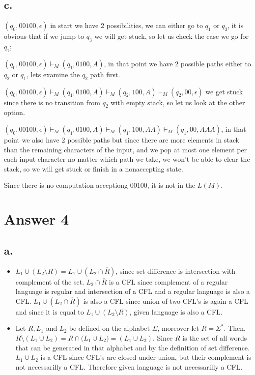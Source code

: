 \documentclass[12pt]{article}
\begin{document}
\subsection*{c.}
$(q_0, 00100, \epsilon )$ in start we have 2 possibilities, we can either go to $q_1$ or $q_3$,
it is obvious that if we jump to $q_3$ we will get stuck, so let us check the case we go for
$q_1$;

$(q_0, 00100, \epsilon )\vdash_M (q_1, 0100, A)$, in that point we have 2 possible paths either to $q_2$
or $q_1$, lets examine the $q_2$ path first.

$(q_0, 00100, \epsilon )\vdash_M (q_1, 0100, A)\vdash_M (q_2, 100, A)\vdash_M (q_2, 00, \epsilon)$
we get stuck since there is no transition from $q_2$ with empty stack, so let us look at the
other option.

$(q_0, 00100, \epsilon )\vdash_M (q_1, 0100, A)\vdash_M (q_1, 100, AA)\vdash_M (q_1, 00, AAA)$, in that
point we also have 2 possible paths but since there are more elements in stack than the remaining
characters of the input, and we pop at most one element per each input character no matter
which path we take, we won't be able to clear the stack, so we will get stuck or finish in a
nonaccepting state.

Since there is no computation acceptiong $00100$, it is not in the $L(M)$.

\section*{Answer 4}

\subsection*{a.}
\begin{itemize}
	\item 
		$L_1\cup (L_2\setminus R) =L_1\cup (L_2\cap \overline{R})$, since set difference is 
		intersection with complement of the set. $L_2\cap \overline{R}$ is a CFL since
		complement of a regular language is regular and intersection of a CFL and a regular
		language is also a CFL. $L_1\cup (L_2\cap \overline{R})$ is also a CFL since union
		of two CFL's is again a CFL and since it is equal to $L_1\cup (L_2\setminus R)$,
		given language is also a CFL.
	\item
		Let $R,L_1$ and $L_2$ be defined on the alphabet $\Sigma$, moreover let $R=\Sigma^*$.
		Then, $R\setminus (L_1\cup L_2) = R\cap \overline{(L_1\cup L_2}) = \overline{(L_1\cup L_2)}$.
		Since $R$ is the set of all words that can be generated in that alphabet and by the
		definition of set difference. $L_1\cup L_2$ is a CFL since CFL's are closed under union,
		but their complement is not necessarilly a CFL. Therefore given language is not
		necessarilly a CFL.
\end{itemize}
\end{document}
